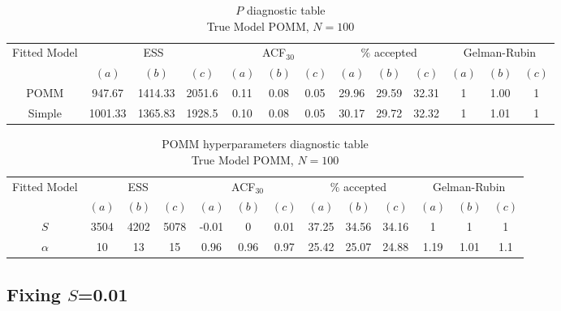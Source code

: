 \documentclass[11pt]{amsart}
\begin{document}
\begin{table}[htbp]
\centering
\caption*{
{\large $P$ diagnostic table} \\ 
{\small True Model POMM, $N=100$}
} 
\begin{tabular}{ccccccccccccc}
\toprule
\multirow{2}{*}{Fitted Model} & \multicolumn{3}{c}{ESS} & \multicolumn{3}{c}{
ACF$_{30}$} & \multicolumn{3}{c}{$\%$ accepted} & \multicolumn{3}{c}{Gelman-Rubin}\\
\cmidrule(lr){2-4} \cmidrule(lr){5-7} \cmidrule(lr){8-10} \cmidrule(lr){11-13} 
& $(a)$ & $(b)$ & $(c)$ & $(a)$ & $(b)$ & $(c)$ & $(a)$ & $(b)$ & $(c)$ & $(a)$ & $(b)$ & $(c)$ \\
\midrule
POMM &947.67 & 1414.33 & 2051.6 & 0.11 & 0.08 & 0.05 & 29.96 & 29.59 & 32.31 & 1 & 1.00 & 1 \\
Simple &1001.33 & 1365.83 & 1928.5 & 0.10 & 0.08 & 0.05 & 30.17 & 29.72 & 32.32 & 1 & 1.01 & 1\\
\bottomrule
\end{tabular}
\label{table:simulations_from_simple}
\end{table}


\begin{table}[htbp]
\centering
\caption*{
{\large POMM hyperparameters diagnostic table} \\ 
{\small True Model POMM, $N=100$}
} 
\begin{tabular}{ccccccccccccc}
\toprule
\multirow{2}{*}{Fitted Model} & \multicolumn{3}{c}{ESS} & \multicolumn{3}{c}{
ACF$_{30}$} & \multicolumn{3}{c}{$\%$ accepted} & \multicolumn{3}{c}{Gelman-Rubin}\\
\cmidrule(lr){2-4} \cmidrule(lr){5-7} \cmidrule(lr){8-10} \cmidrule(lr){11-13} 
& $(a)$ & $(b)$ & $(c)$ & $(a)$ & $(b)$ & $(c)$ & $(a)$ & $(b)$ & $(c)$ & $(a)$ & $(b)$ & $(c)$ \\
\midrule
$S$ &3504 & 4202 & 5078 & -0.01 & 0 & 0.01 & 37.25 & 34.56 & 34.16 & 1 & 1 & 1 \\
$\alpha$ &10 & 13 & 15 & 0.96 & 0.96 & 0.97 & 25.42 & 25.07 & 24.88 & 1.19 & 1.01 & 1.1     \\
\bottomrule
\end{tabular}
\label{table:simulations_from_simple}
\end{table}

\clearpage

\subsection{Fixing $S$=0.01}
\end{document}
